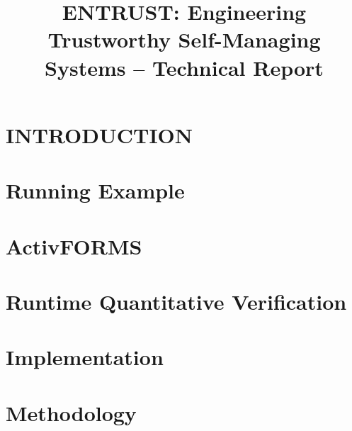 \documentclass[a4paper]{llncs}
\newcommand{\approach}{ENTRUST}
\begin{document}
\title{\approach: Engineering Trustworthy Self-Managing Systems -- Technical Report}
\author{}
\institute{}
\maketitle


\section{INTRODUCTION} \label{sec:introduction}


\section{Running Example}\label{sec:example}


\section{ActivFORMS}\label{sec:activForms}


\section{Runtime Quantitative Verification}\label{sec:rqv}


\section{Implementation}\label{sec:implementation}


\section{Methodology}




\end{document}
